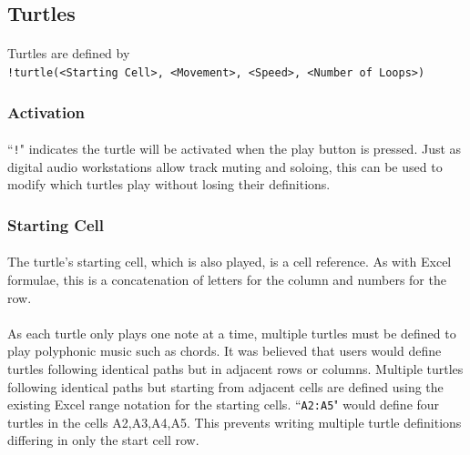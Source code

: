 \subsection{Turtles}

\paragraph{} Turtles are defined by \\
\texttt{!turtle(<Starting Cell>, <Movement>, <Speed>, <Number of Loops>)}

\subsubsection{Activation}

\paragraph{} ``\texttt{!}" indicates the turtle will be activated when the play button is pressed. Just as digital audio workstations allow track muting and soloing, this can be used to modify which turtles play without losing their definitions.

\subsubsection{Starting Cell}

\paragraph{} The turtle's starting cell, which is also played, is a cell reference. As with Excel formulae, this is a concatenation of letters for the column and numbers for the row.

\paragraph{} As each turtle only plays one note at a time, multiple turtles must be defined to play polyphonic music such as chords. It was believed that users would define turtles following identical paths but in adjacent rows or columns. Multiple turtles following identical paths but starting from adjacent cells are defined using the existing Excel range notation for the starting cells. ``\texttt{A2:A5}" would define four turtles in the cells A2,A3,A4,A5. This prevents writing multiple turtle definitions differing in only the start cell row.

